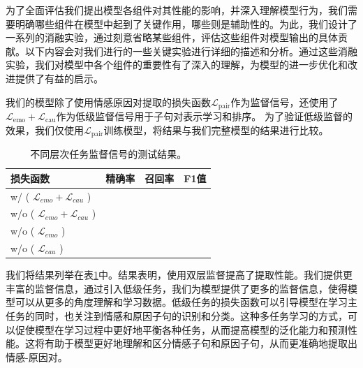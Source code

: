 

为了全面评估我们提出模型各组件对其性能的影响，并深入理解模型行为，我们需要明确哪些组件在模型中起到了关键作用，哪些则是辅助性的。为此，我们设计了一系列的消融实验，通过刻意省略某些组件，评估这些组件对模型输出的具体贡献。以下内容会对我们进行的一些关键实验进行详细的描述和分析。通过这些消融实验，我们对模型中各个组件的重要性有了深入的理解，为模型的进一步优化和改进提供了有益的启示。



我们的模型除了使用情感原因对提取的损失函数$\mathcal{L}_{\text{pair}}$作为监督信号，还使用了 $ \mathcal{L}_{\text{emo}} + \mathcal{L}_{\text{cau}}$作为低级监督信号用于子句对表示学习和排序。
为了验证低级监督的效果，我们仅使用$\mathcal{L}_{\text{pair}}$训练模型，将结果与我们完整模型的结果进行比较。


\begin{table}[ht]
   \vspace{8pt}
   \renewcommand{\arraystretch}{1.2}
   \centering\wuhao
   \caption{不同层次任务监督信号的测试结果。}
    \label{tab:subloss}
   
   \vspace{4mm}
    
    \begin{tabularx}{\textwidth} { 
      >{\centering\arraybackslash}X 
      >{\centering\arraybackslash}X
      >{\centering\arraybackslash}X
      >{\centering\arraybackslash}X 
   }

   \toprule[1.5pt]
\textbf{损失函数}             & 精确率 & 召回率 & F1值 \\     \midrule[1pt]
w/ ( $\mathcal{L}_{emo} + \mathcal{L}_{cau}$ )    &  &  &  
    \\ 
w/o ( $\mathcal{L}_{emo} + \mathcal{L}_{cau}$ )     &  &  &     \\
w/o ( $\mathcal{L}_{emo} $ )         &  &  &    \\
w/o ( $\mathcal{L}_{cau}$ )         &  &  &    \\     \bottomrule
\end{tabularx}
\vspace{8pt}
\end{table}

我们将结果列举在表\ref{tab:subloss}中。结果表明，使用双层监督提高了提取性能。我们提供更丰富的监督信息，通过引入低级任务，我们为模型提供了更多的监督信息，使得模型可以从更多的角度理解和学习数据。低级任务的损失函数可以引导模型在学习主任务的同时，也关注到情感和原因子句的识别和分类。这种多任务学习的方式，可以促使模型在学习过程中更好地平衡各种任务，从而提高模型的泛化能力和预测性能。这将有助于模型更好地理解和区分情感子句和原因子句，从而更准确地提取出情感-原因对。


